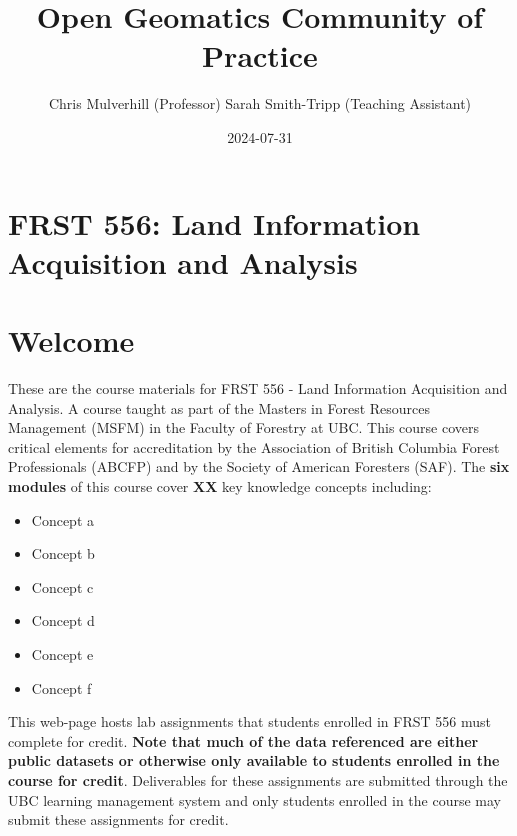 \documentclass[
  letterpaper,
]{book}
\title{Open Geomatics Community of Practice}
\author{Chris Mulverhill (Professor) Sarah Smith-Tripp (Teaching
Assistant)}
\date{2024-07-31}
\renewcommand*\contentsname{Table of contents}
\newcommand\contentsname{Table of contents}
\begin{document}
\frontmatter
\maketitle
\ifdefined\Shaded\renewenvironment{Shaded}{\begin{tcolorbox}[boxrule=0pt, interior hidden, borderline west={3pt}{0pt}{shadecolor}, breakable, frame hidden, sharp corners, enhanced]}{\end{tcolorbox}}\fi

\renewcommand*\contentsname{Table of contents}
{
\setcounter{tocdepth}{2}
\tableofcontents
}
\mainmatter
{}

\hypertarget{frst-556-land-information-acquisition-and-analysis}{%
\chapter{FRST 556: Land Information Acquisition and
Analysis}\label{frst-556-land-information-acquisition-and-analysis}}


\hypertarget{welcome}{%
\chapter*{Welcome}\label{welcome}}


These are the course materials for FRST 556 - Land Information
Acquisition and Analysis. A course taught as part of the Masters in
Forest Resources Management (MSFM) in the Faculty of Forestry at UBC.
This course covers critical elements for accreditation by the
Association of British Columbia Forest Professionals (ABCFP) and by the
Society of American Foresters (SAF). The \textbf{six modules} of this
course cover \textbf{XX} key knowledge concepts including:

\begin{itemize}
\item
  Concept a
\item
  Concept b
\item
  Concept c
\item
  Concept d
\item
  Concept e
\item
  Concept f
\end{itemize}

This web-page hosts lab assignments that students enrolled in FRST 556
must complete for credit. \textbf{Note that much of the data referenced
are either public datasets or otherwise only available to students
enrolled in the course for credit}. Deliverables for these assignments
are submitted through the UBC learning management system and only
students enrolled in the course may submit these assignments for credit.
\end{document}
